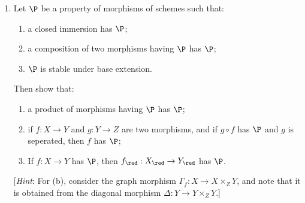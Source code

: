 \documentclass[12pt]{amsart}
\begin{document}


\begin{enumerate}
  \item[4.8.] {
      Let $\P$ be a property of morphisms of schemes such that:
      \begin{enumerate}[label=(\roman*)]
        \item a closed immersion has $\P$;
        \item a composition of two morphisms having $\P$ has $\P$;
        \item $\P$ is stable under base extension.
      \end{enumerate}
      Then show that:
      \begin{enumerate}
        \item a product of morphisms having $\P$ has $\P$;
        \item if $f:X\to Y$ and $g:Y\to Z$ are two morphisms, and if $g\circ f$ has $\P$ and $g$ is seperated, then $f$ has $\P$;
        \item If $f:X\to Y$ has $\P$, then $f_{\red}:X_\red\to Y_\red$ has $\P$.
      \end{enumerate}

      [\emph{Hint}: For (b), consider the graph morphism $\Gamma_f:X\to X\times_Z Y$, and note that it is obtained from the diagonal morphism $\Delta:Y\to Y\times_ZY$.]
    }
\end{enumerate}
\end{document}
